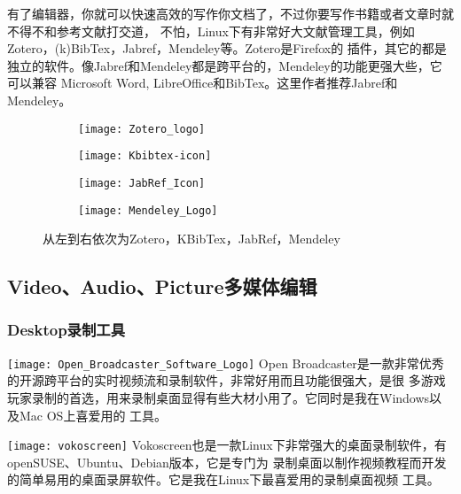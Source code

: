 \documentclass[11pt,fleqn]{book} %
\begin{document}
有了编辑器，你就可以快速高效的写作你文档了，不过你要写作书籍或者文章时就不得不和参考文献打交道，
不怕，Linux下有非常好大文献管理工具，例如Zotero，(k)BibTex，Jabref，Mendeley等。Zotero是Firefox的
插件，其它的都是独立的软件。像Jabref和Mendeley都是跨平台的，Mendeley的功能更强大些，它可以兼容
Microsoft Word, LibreOffice和BibTex。这里作者推荐Jabref和Mendeley。
\begin{figure}[!h]
  \begin{subfigure}{0.24\textwidth}
    \texttt{[image: Zotero\_logo]}
  \end{subfigure}
  \begin{subfigure}{0.24\textwidth}
    \texttt{[image: Kbibtex-icon]}
  \end{subfigure}
  \begin{subfigure}{0.24\textwidth}
    \texttt{[image: JabRef\_Icon]}
  \end{subfigure}
  \begin{subfigure}{0.24\textwidth}
    \texttt{[image: Mendeley\_Logo]}
  \end{subfigure}
  \caption{从左到右依次为Zotero，KBibTex，JabRef，Mendeley}
\end{figure}

\subsection{Video、Audio、Picture多媒体编辑}

\subsubsection{Desktop录制工具}
\texttt{[image: Open\_Broadcaster\_Software\_Logo]}
  Open Broadcaster是一款非常优秀的开源跨平台的实时视频流和录制软件，非常好用而且功能很强大，是很
  多游戏玩家录制的首选，用来录制桌面显得有些大材小用了。它同时是我在Windows以及Mac OS上喜爱用的
  工具。

  \texttt{[image: vokoscreen]}
  Vokoscreen也是一款Linux下非常强大的桌面录制软件，有openSUSE、Ubuntu、Debian版本，它是专门为
  录制桌面以制作视频教程而开发的简单易用的桌面录屏软件。它是我在Linux下最喜爱用的录制桌面视频
  工具。

\end{document}
